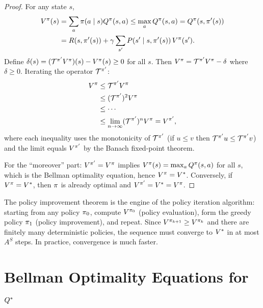 \documentclass[11pt,a4paper]{article}
\begin{document}
\begin{proof}
For any state $s$,
\begin{align*}
    V^{\pi}(s)
    &= \sum_a \pi(a \mid s) Q^{\pi}(s,a)
    \leq \max_a Q^{\pi}(s,a)
    = Q^\pi(s, \pi'(s)) \\
    &= R(s, \pi'(s)) + \gamma \sum_{s'}
       P(s' \mid s, \pi'(s))\, V^{\pi}(s').
\end{align*}
Define $\delta(s) = (\mathcal{T}^{\pi'} V^{\pi})(s) - V^{\pi}(s) \geq 0$
for all $s$. Then
$V^{\pi} = \mathcal{T}^{\pi'} V^{\pi} - \delta$ where $\delta \geq 0$.
Iterating the operator $\mathcal{T}^{\pi'}$:
\begin{align*}
    V^{\pi} &\leq \mathcal{T}^{\pi'} V^{\pi} \\
    &\leq (\mathcal{T}^{\pi'})^2 V^{\pi} \\
    &\leq \cdots \\
    &\leq \lim_{n \to \infty} (\mathcal{T}^{\pi'})^n V^{\pi}
    = V^{\pi'},
\end{align*}
where each inequality uses the monotonicity of $\mathcal{T}^{\pi'}$
(if $u \leq v$ then $\mathcal{T}^{\pi'} u \leq \mathcal{T}^{\pi'} v$)
and the limit equals $V^{\pi'}$ by the Banach fixed-point theorem.

For the ``moreover'' part: $V^{\pi'} = V^{\pi}$ implies
$V^{\pi}(s) = \max_a Q^{\pi}(s,a)$ for all $s$, which is the Bellman
optimality equation, hence $V^{\pi} = V^*$. Conversely, if
$V^{\pi} = V^*$, then $\pi$ is already optimal and
$V^{\pi'} = V^* = V^{\pi}$.
\end{proof}

\begin{rlconnection}[title={Policy Improvement in Policy Iteration}]
The policy improvement theorem is the engine of the policy iteration
algorithm: starting from any policy $\pi_0$, compute
$V^{\pi_0}$ (policy evaluation), form the greedy policy
$\pi_1$ (policy improvement), and repeat. Since
$V^{\pi_{k+1}} \geq V^{\pi_k}$ and there are finitely many
deterministic policies, the sequence must converge to $V^*$ in at
most $A^S$ steps. In practice, convergence is much faster.
\end{rlconnection}


\section{Bellman Optimality Equations for $Q^*$}
\label{sec:bellman-q}
\end{document}

